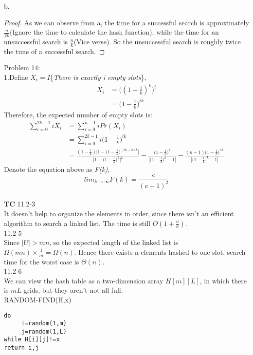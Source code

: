 \documentclass{article}
\begin{document}
b.\begin{proof}
As we can observe from a, the time for a successful search is approximately $\frac{n}{2k}$(Ignore the time to calculate the hash function), while the time for an unsuccessful search is $\frac{n}{k}$(Vice verse). So the unsuccessful search is roughly twice the time of a successful search.
\end{proof}
Problem 14:\\
1.Define $X_i=I$\{\emph{There is exactly i empty slots}\},
\begin{equation*}
\begin{aligned}
X_i&=\big((1-\frac{1}{k})^k\big)^i\\
&=\big(1-\frac{1}{k}\big)^{ik}
\end{aligned}
\end{equation*}
Therefore, the expected number of empty slots is:
\begin{equation*}
\begin{aligned}
\sum_{i=0}^{2k-1}iX_i&=\sum_{i=0}^{n-1}iPr(X_i)\\
&=\sum_{i=0}^{2k-1}i\big(1-\frac{1}{k}\big)^{ik}\\
&=\frac{(1-\frac{1}{k})\big[1-\big(1-\frac{1}{k}\big)^{(2k-2)k}\big]}{\big[1-\big(1-\frac{1}{k}\big)^k\big]^2}-\frac{\big(1-\frac{1}{k}\big)^k}{\big[\big(1-\frac{1}{k}\big)^k-1\big]}-\frac{(n-1)\big(1-\frac{1}{k}\big)^{nk}}{\big[\big(1-\frac{1}{k}\big)^k-1\big]}
\end{aligned}
\end{equation*}
Denote the equation above as \emph{F(k)}, \[lim_{k\to\infty}F(k)=\frac{e}{(e-1)^2}\]\\
\textbf{TC} 11.2-3\\
It doesn't help to organize the elements in order, since there isn't an efficient algorithm to search a linked list. The time is still $O(1+\frac{n}{k}).$\\
11.2-5\\
Since $\big|U\big|>mn$, so the expected length of the linked list is $\Omega (mn)\times\frac{1}{m}=\Omega(n).$ Hence there exists n elements hashed to one slot, search time for the worst case is $\Theta(n)$.\\
11.2-6\\
We can view the hash table as a two-dimension array $H[m][L]$, in which there is $mL$ grids, but they aren't not all full.\\
RANDOM-FIND(H,x)
\lstset{language=C}
\begin{lstlisting}
do
     i=random(1,m)
     j=random(1,L)
while H[i][j]!=x
return i,j
\end{lstlisting}
\end{document}
